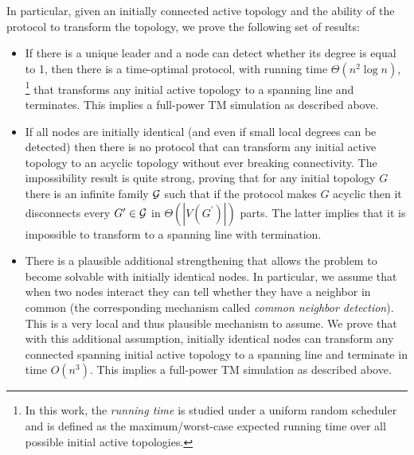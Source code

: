 \documentclass[preprint]{elsarticle}
\begin{document}
In particular, given an initially connected active topology and the ability of the protocol to transform the topology, we prove the following set of results:
\begin{itemize}
\item If there is a unique leader and a node can detect whether its degree is equal to 1, then there is a time-optimal protocol, with running time $\Theta(n^2\log n)$, \footnote{In this work, the \emph{running time} is studied under a uniform random scheduler and is defined as the maximum/worst-case expected running time over all possible initial active topologies.} that transforms any initial active topology to a spanning line and terminates.
This implies a full-power TM simulation as described above.
\item If all nodes are initially identical (and even if small local degrees can be detected) then there is no protocol that can transform any initial active topology to an acyclic topology without ever breaking connectivity. The impossibility result is quite strong, proving that for any initial topology $G$ there is an infinite family $\cal{G}$ such that if the protocol makes $G$ acyclic then it disconnects every $G^\prime\in \cal{G}$ in $\Theta(|V(G^\prime)|)$ parts. The latter implies that it is impossible to transform to a spanning line with termination.
\item There is a plausible additional strengthening that allows the problem to become solvable with initially identical nodes. In particular, we assume that when two nodes interact they can tell whether they have a neighbor in common (the corresponding mechanism called \emph{common neighbor detection}). This is a very local and thus plausible mechanism to assume. We prove that with this additional assumption, initially identical nodes can transform any connected spanning initial active topology to a spanning line and terminate in time $O(n^3)$. This implies a full-power TM simulation as described above.
\end{itemize}
\end{document}
